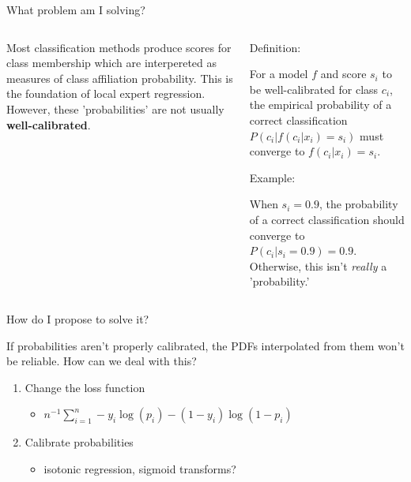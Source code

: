 \documentclass[ignorenonframetext,]{beamer}
\providecommand{\tightlist}{%
\setlength{\itemsep}{0pt}\setlength{\parskip}{0pt}}
\begin{document}
\begin{frame}{What problem am I solving?}

\begin{columns}
\begin{column}{0.48\textwidth}

Most classification methods produce scores for class membership which are interpereted as measures of class affiliation probability. This is the foundation of local expert regression. However, these 'probabilities' are not usually \textbf{well-calibrated}. 

\end{column}


\begin{column}{0.48\textwidth}
\begin{block}{Definition:}

For a model $f$ and score $s_i$ to be well-calibrated for class $c_i$, the empirical probability of a correct classification $P(c_i | f( c_i | x_i)=s_i)$ must converge to $f(c_i | x_i) = s_i$.

\end{block}
\begin{block}{Example:}

When $s_i = 0.9$, the probability of a correct classification should converge to $P(c_i | s_i = 0.9) = 0.9$. Otherwise, this isn't \textit{really} a 'probability.'

\end{block}
\end{column}
\end{columns}

\end{frame}

\begin{frame}{How do I propose to solve it?}

\begin{block}{If probabilities aren't properly calibrated, the PDFs
interpolated from them won't be reliable. How can we deal with this?}

\begin{enumerate}
\def\labelenumi{\arabic{enumi}.}
\tightlist
\item
  Change the loss function

  \begin{itemize}
  \tightlist
  \item
    \(n^{-1}\sum_{i=1}^{n}-y_i\log(p_i)-(1-y_i)\log(1-p_i)\)
  \end{itemize}
\item
  Calibrate probabilities

  \begin{itemize}
  \tightlist
  \item
    isotonic regression, sigmoid transforms?
  \end{itemize}
\end{enumerate}

\end{block}

\end{frame}
\end{document}
